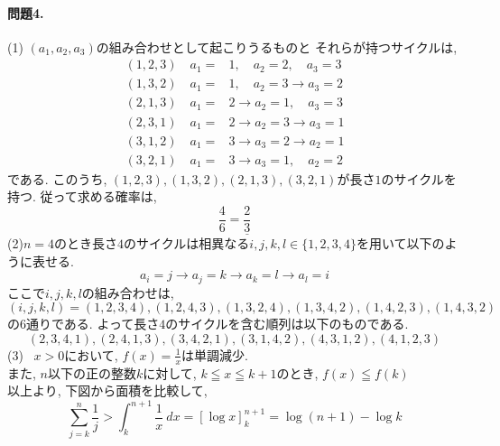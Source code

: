 \documentclass[11pt]{jarticle}
\begin{document}
\title{}
\date{}
\author{}
\maketitle
\paragraph{問題4.}
(1) $(a_1, a_2, a_3)$の組み合わせとして起こりうるものと
それらが持つサイクルは, 
\begin{align*}
  (1, 2, 3) \quad a_1=& 1,\quad a_2= 2,\quad a_3= 3 \\
  (1, 3, 2) \quad a_1=& 1,\quad a_2= 3 \to a_3= 2 \\
  (2, 1, 3) \quad a_1=& 2 \to a_2= 1,\quad a_3= 3 \\
  (2, 3, 1) \quad a_1=& 2 \to a_2= 3 \to a_3= 1 \\
  (3, 1, 2) \quad a_1=& 3 \to a_3= 2 \to a_2= 1 \\
  (3, 2, 1) \quad a_1=& 3 \to a_3= 1,\quad a_2= 2
\end{align*}
である. このうち, $(1,2,3), (1,3,2), (2,1,3), (3,2,1)$が長さ$1$のサイクルを持つ. 
従って求める確率は, 
\begin{equation*}
  \frac{4}{6} = \underline{\frac{2}{3}}
\end{equation*}
(2)$n = 4$のとき長さ$4$のサイクルは相異なる$i, j, k, l \in \{ 1, 2, 3, 4 \}$を用いて以下のように表せる. 
\begin{equation*}
  a_{i} = j \to a_{j} = k \to a_{k} = l \to a_{l} = i
\end{equation*}
ここで$ i, j, k, l $の組み合わせは, 
\begin{equation*}
  (i, j, k, l) = (1, 2, 3, 4), (1, 2, 4, 3), (1, 3, 2, 4), (1, 3, 4, 2), (1, 4, 2, 3), (1, 4, 3, 2)
\end{equation*}
の6通りである. よって長さ$4$のサイクルを含む順列は以下のものである. 
\begin{equation*}
  (2, 3, 4, 1), (2, 4, 1, 3), (3, 4, 2, 1), (3, 1, 4, 2), (4, 3, 1, 2), (4, 1, 2, 3) 
\end{equation*}
(3) \ $x>0$において, $f(x)=\frac{1}{x}$は単調減少. \\
また, $n$以下の正の整数$k$に対して, $k\leqq x\leqq k+1$のとき, $f(x)\leqq f(k)$ \\
以上より, 下図から面積を比較して, \\
\begin{equation*}
  \sum_{j=k}^{n} \frac{1}{j} 
  > \int_{k}^{n+1} \frac{1}{x} \ dx 
  = \left[ \log x \right]_{k}^{n+1}
  = \log (n+1) - \log k
\end{equation*}
\end{document}

